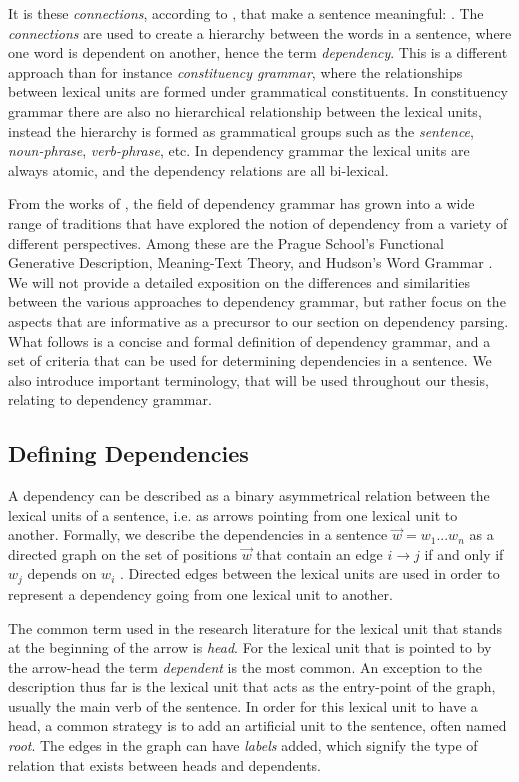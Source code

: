 It is these \textit{connections}, according to \citeauthor{Tes:15}, that make a sentence meaningful:  \cite{Tes:15}. The \textit{connections} are used to create a hierarchy between the words in a sentence, where one word is dependent on another, hence the term \textit{dependency}. This is a different approach than for instance \textit{constituency grammar}, where the relationships between lexical units are formed under grammatical constituents. In constituency grammar there are also no hierarchical relationship between the lexical units, instead the hierarchy is formed as grammatical groups such as the \textit{sentence}, \textit{noun-phrase}, \textit{verb-phrase}, etc. In dependency grammar the lexical units are always atomic, and the dependency relations are all bi-lexical.

From the works of \citeauthor{Tes:15}, the field of dependency grammar has grown into a wide range of traditions that have explored the notion of dependency from a variety of different perspectives. Among these are the Prague School's Functional Generative Description, Meaning-Text Theory, and Hudson's Word Grammar \cite{Sgall:86, Mel:88, Hudson:90}. We will not provide a detailed exposition on the differences and similarities between the various approaches to dependency grammar, but rather focus on the aspects that are informative as a precursor to our section on dependency parsing. What follows is a concise and formal definition of dependency grammar, and a set of criteria that can be used for determining dependencies in a sentence. We also introduce important terminology, that will be used throughout our thesis, relating to dependency grammar.

\subsection{Defining Dependencies}
\label{definitions}

A dependency can be described as a binary asymmetrical relation between the lexical units of a sentence, i.e. as arrows pointing from one lexical unit to another. Formally, we describe the dependencies in a sentence $\vec{w} = w_1 ... w_n$ as a directed graph on the set of positions $\vec{w}$ that contain an edge $i \rightarrow j$ if and only if $w_j$ depends on $w_i$ \cite{Kuhl:10}. Directed edges between the lexical units are used in order to represent a dependency going from one lexical unit to another.

The common term used in the research literature for the lexical unit that stands at the beginning of the arrow is \textit{head}. For the lexical unit that is pointed to by the arrow-head the term \textit{dependent} is the most common. An exception to the description thus far is the lexical unit that acts as the entry-point of the graph, usually the main verb of the sentence. In order for this lexical unit to have a head, a common strategy is to add an artificial unit to the sentence, often named \textit{root}. The edges in the graph can have \textit{labels} added, which signify the type of relation that exists between heads and dependents. 

